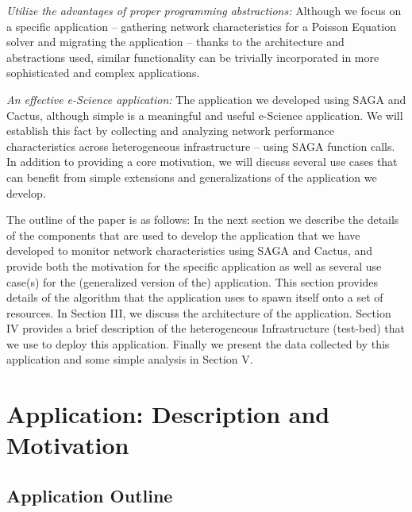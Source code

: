 \documentclass[conference,final]{IEEEtran}
\newcommand{\jhanote}[1]{ {\textcolor{red} { ***Jha: #1 }}}
\begin{document}
{\it Utilize the advantages of proper programming abstractions:}
Although we focus on a specific application -- gathering network
characteristics for a Poisson Equation solver and migrating the
application -- thanks to the architecture and abstractions used,
similar functionality can be trivially incorporated in more
sophisticated and complex applications.

{\it An effective e-Science application:} The application we
developed using SAGA and Cactus, although simple is a meaningful and
useful e-Science application.  We will establish this fact by
collecting and analyzing network performance characteristics across
heterogeneous infrastructure -- using SAGA function calls. In addition
to providing a core motivation, we will discuss several use cases that
can benefit from simple extensions and generalizations of the
application we develop.


The outline of the paper is as follows: In the next section we
describe the details of the components that are used to develop the
application that we have developed to monitor network characteristics
using SAGA and Cactus, and provide both the motivation for the
specific application as well as several use case(s) for the
(generalized version of the) application. This section provides
details of the algorithm that the application uses to spawn itself
onto a set of resources.  In Section III, we discuss the architecture
of the application. Section IV provides a brief description of the
heterogeneous Infrastructure (test-bed) that we use to deploy this
application. Finally we present the data collected by this application
and some simple analysis in Section V.

\section{Application: Description and Motivation}

\subsection{Application Outline}
\end{document}
